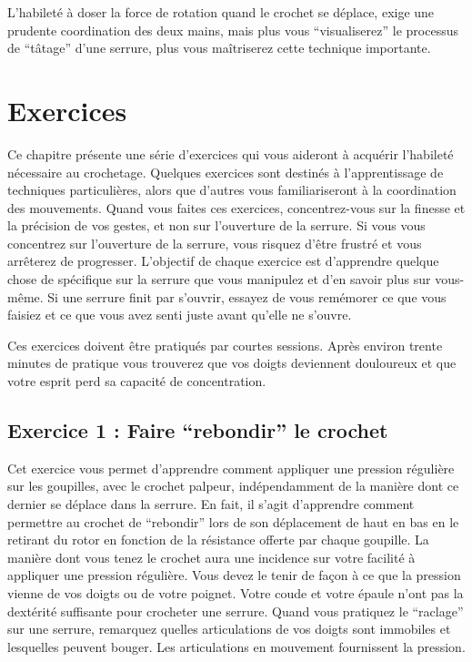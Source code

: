 \documentclass[a4paper,french,11pt,twoside]{report}
\begin{document}
L'habileté à doser la force de rotation quand le crochet se déplace, exige une prudente coordination des deux mains, mais plus vous \enquote{visualiserez} le processus de \enquote{tâtage} d'une serrure, plus vous maîtriserez cette technique importante.


\chapter{\label{chap:exercices}Exercices}
Ce chapitre présente une série d'exercices qui vous aideront à acquérir l'habileté nécessaire au crochetage. Quelques exercices sont destinés à l'apprentissage de techniques particulières, alors que d'autres vous familiariseront à la coordination des mouvements. Quand vous faites ces exercices, concentrez-vous sur la finesse et la précision de vos gestes, et non sur l'ouverture de la serrure. Si vous vous concentrez sur l'ouverture de la serrure, vous risquez d'être frustré et vous arrêterez de progresser. L'objectif de chaque exercice est d'apprendre quelque chose de spécifique sur la serrure que vous manipulez et d'en savoir plus sur vous-même. Si une serrure finit par s'ouvrir, essayez de vous remémorer ce que vous faisiez et ce que vous avez senti juste avant qu'elle ne s'ouvre.

Ces exercices doivent être pratiqués par courtes sessions. Après environ trente minutes de pratique vous trouverez que vos doigts deviennent douloureux et que votre esprit perd sa capacité de concentration.

\section{Exercice 1 : Faire \enquote{rebondir} le crochet}

Cet exercice vous permet d'apprendre comment appliquer une pression régulière sur les goupilles, avec le crochet palpeur, indépendamment de la manière dont ce dernier se déplace dans la serrure. En fait, il s'agit d'apprendre comment permettre au crochet de \enquote{rebondir} lors de son déplacement de haut en bas en le retirant du rotor en fonction de la résistance offerte par chaque goupille. La manière dont vous tenez le crochet aura une incidence sur votre facilité à appliquer une pression régulière. Vous devez le tenir de façon à ce que la pression vienne de vos doigts ou de votre poignet. Votre coude et votre épaule n'ont pas la dextérité suffisante pour crocheter une serrure. Quand vous pratiquez le \enquote{raclage} sur une serrure, remarquez quelles articulations de vos doigts sont immobiles et lesquelles peuvent bouger. Les articulations en mouvement fournissent la pression.
\end{document}
